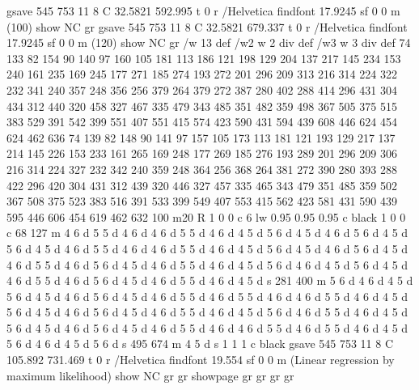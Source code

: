  gsave  545 753 11 8 C 32.5821 592.995 t 0 r /Helvetica findfont 17.9245 sf 0 0 m (100) show NC gr 
 gsave  545 753 11 8 C 32.5821 679.337 t 0 r /Helvetica findfont 17.9245 sf 0 0 m (120) show NC gr  /w 13 def /w2 {w 2 div} def /w3 {w 3 div} def 74 133 82 154 90 140 97 160 105 181 113 186 121 198 129 204 137 217 145 234 153 240 161 235 169 245 177
 271 185 274 193 272 201 296 209 313 216 314 224 322 232 341 240 357 248 356 256 379 264 379 272 387 280 402 288 414 296 431 304 434 312 440 320 458 327 467 335 479 343 485 351 482 359 498 367 505 375 515 383 529 391 542 399 551 407 551 415 574 423
 590 431 594 439 608 446 624 454 624 462 636 74 139 82 148 90 141 97 157 105 173 113 181 121 193 129 217 137 214 145 226 153 233 161 265 169 248 177 269 185 276 193 289 201 296 209 306 216 314 224 327 232 342 240 359 248 364 256 368 264 381 272 390
 280 393 288 422 296 420 304 431 312 439 320 446 327 457 335 465 343 479 351 485 359 502 367 508 375 523 383 516 391 533 399 549 407 553 415 562 423 581 431 590 439 595 446 606 454 619 462 632 100 { m20} R 1 0 0 c 6 lw 0.95 0.95 0.95 c black 1 0 0 c
 68 127 m 4 6 d 5 5 d 4 6 d 4 6 d 5 5 d 4 6 d 4 5 d 5 6 d 4 5 d 4 6 d 5 6 d 4 5 d 5 6 d 4 5 d 4 6 d 5 5 d 4 6 d 4 6 d 5 5 d 4 6 d 4 5 d 5 6 d 4 5 d 4 6 d 5 6 d 4 5 d 4 6 d 5 5 d 4 6 d 5 6 d 4 5 d 4 6 d 5 5 d 4 6 d 4 5 d 5 6 d 4 6 d 4 5 d 5 6 d 4 5 d
 4 6 d 5 5 d 4 6 d 5 6 d 4 5 d 4 6 d 5 5 d 4 6 d 4 5 d s 281 400 m 5 6 d 4 6 d 4 5 d 5 6 d 4 5 d 4 6 d 5 6 d 4 5 d 4 6 d 5 5 d 4 6 d 5 5 d 4 6 d 4 6 d 5 5 d 4 6 d 4 5 d 5 6 d 4 5 d 4 6 d 5 6 d 4 5 d 4 6 d 5 5 d 4 6 d 4 5 d 5 6 d 4 6 d 5 5 d 4 6 d 4 5
 d 5 6 d 4 5 d 4 6 d 5 6 d 4 5 d 4 6 d 5 5 d 4 6 d 4 6 d 5 5 d 4 6 d 5 5 d 4 6 d 4 5 d 5 6 d 4 6 d 4 5 d 5 6 d s 495 674 m 4 5 d s 1 1 1 c black
 gsave  545 753 11 8 C 105.892 731.469 t 0 r /Helvetica findfont 19.554 sf 0 0 m (Linear regression by maximum likelihood) show NC gr  gr showpage
 gr 
 gr  gr  gr 
